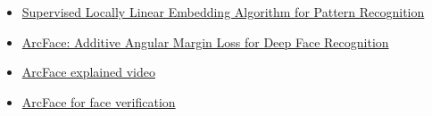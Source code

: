 \documentclass[a4paper, 12pt]{article}
\begin{document}
\begin{itemize}
    \item \href{https://www.researchgate.net/publication/221258597_Supervised_Locally_Linear_Embedding_Algorithm_for_Pattern_Recognition}{Supervised Locally Linear Embedding Algorithm for Pattern Recognition}
    \item \href{https://arxiv.org/abs/1801.07698}{ArcFace: Additive Angular Margin Loss for Deep Face Recognition}
    \item \href{https://www.youtube.com/watch?v=H1qEp_czI1I&t=51s}{ArcFace explained video}
    \item \href{https://github.com/peteryuX/arcface-tf2}{ArcFace for face verification}
\end{itemize}
\end{document}
